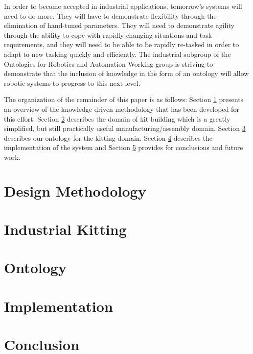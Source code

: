\documentclass[preprint,12pt]{elsarticle}
\begin{document}
In order to become accepted in industrial applications, tomorrow\rq{}s systems will need to do more. 
They will have to demonstrate flexibility through the
elimination of hand-tuned parameters. They will need to demonstrate agility through the 
ability to cope with rapidly changing situations and task requirements,
and they will need to be able to be rapidly re-tasked in order to adapt 
to new tasking quickly and efficiently. The  industrial subgroup of the
Ontologies for Robotics and Automation Working group is striving to demonstrate 
that the inclusion of knowledge in the form of an ontology
will allow robotic systems to progress to this next level.

The organization of the remainder of this paper is as follows: Section \ref{Sect:Methodology} presents an overview of the knowledge driven methodology that
has been developed for this effort. Section \ref{Sect:Kitting} describes the domain of kit building
which is a greatly simplified, but still practically useful manufacturing/assembly domain. Section \ref{Sect:Ontology} describes our ontology for the kitting
domain. Section \ref{Sect:Implementation} describes the implementation of the system and Section \ref{Sect:Conclusion} provides for conclusions and
future work.


\section{Design Methodology}
\label{Sect:Methodology}


\section{Industrial Kitting}
\label{Sect:Kitting}


\section{Ontology}
\label{Sect:Ontology}

\section{Implementation}
\label{Sect:Implementation}

\section{Conclusion}
\label{Sect:Conclusion}

\end{document}
